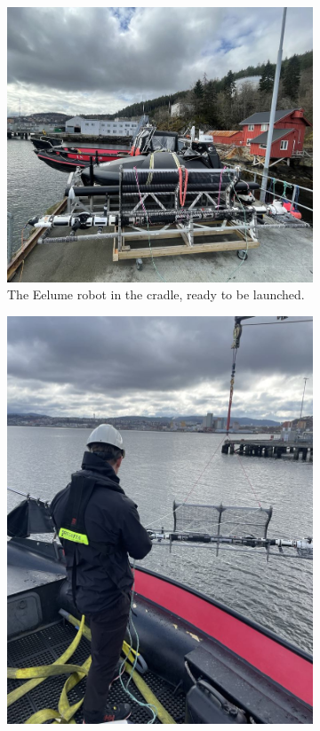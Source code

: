 \begin{figure}
    \centering
    \begin{subfigure}{0.384\textwidth}
        \centering
        \includegraphics[width=\textwidth]{assets/launch/32.jpeg}
        \caption{The Eelume robot in the cradle, ready to be launched.}
    \end{subfigure}
    \begin{subfigure}{0.26\textwidth}
        \centering
        \includegraphics[width=\textwidth]{assets/launch/2.jpeg}

\end{subfigure}
\end{figure}
